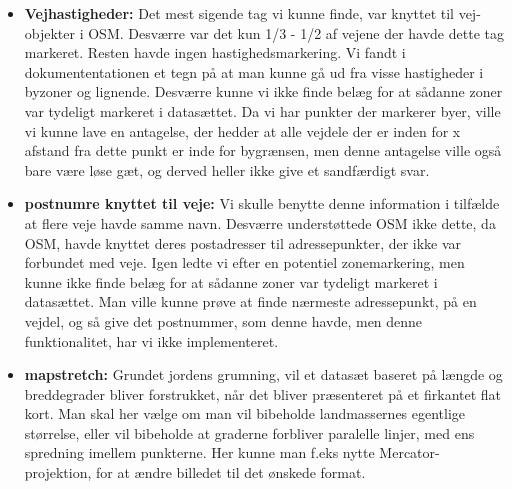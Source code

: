 \begin{itemize}
	\item \textbf{Vejhastigheder:} Det mest sigende tag vi kunne finde, var knyttet til vej-objekter i OSM. Desværre var det kun 1/3 - 1/2 af vejene der havde dette tag markeret. Resten havde ingen hastighedsmarkering. Vi fandt i dokumententationen et tegn på at man kunne gå ud fra visse hastigheder i byzoner og lignende. Desværre kunne vi ikke finde belæg for at sådanne zoner var tydeligt markeret i datasættet. Da vi har punkter der markerer byer, ville vi kunne lave en antagelse, der hedder at alle vejdele der er inden for x afstand fra dette punkt er inde for bygrænsen, men denne antagelse ville også bare være løse gæt, og derved heller ikke give et sandfærdigt svar.
	\item \textbf{postnumre knyttet til veje:} Vi skulle benytte denne information i tilfælde at flere veje havde samme navn. Desværre understøttede OSM ikke dette, da OSM, havde knyttet deres postadresser til adressepunkter, der ikke var forbundet med veje. Igen ledte vi efter en potentiel zonemarkering, men kunne ikke finde belæg for at sådanne zoner var tydeligt markeret i datasættet. Man ville kunne prøve at finde nærmeste adressepunkt, på en vejdel, og så give det postnummer, som denne havde, men denne funktionalitet, har vi ikke implementeret.
	\item \textbf{mapstretch:} Grundet jordens grumning, vil et datasæt baseret på længde og breddegrader bliver forstrukket, når det bliver præsenteret på et firkantet flat kort. Man skal her vælge om man vil bibeholde landmassernes egentlige størrelse, eller vil bibeholde at graderne forbliver paralelle linjer, med ens spredning imellem punkterne. Her kunne man f.eks nytte Mercator-projektion, for at ændre billedet til det ønskede format.
\end{itemize}